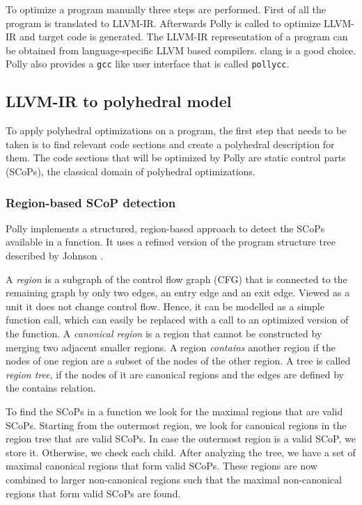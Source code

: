 To optimize a program manually three steps are performed. First of all the
program is translated to LLVM-IR. Afterwards Polly is called to optimize LLVM-IR and
target code is generated. The LLVM-IR representation of a program can
be obtained from language-specific LLVM based compilers. clang is a
good choice. Polly also provides a \texttt{gcc} like user interface that is
called \texttt{pollycc}.

\subsection{LLVM-IR to polyhedral model}

To apply polyhedral optimizations on a program, the first step that needs to be
taken is to find relevant code sections and create a polyhedral description for
them. The code sections that will be optimized by Polly are static
control parts (SCoPs), the classical domain of polyhedral optimizations.

\subsubsection{Region-based SCoP detection}
Polly implements a structured, region-based approach to detect
the SCoPs available in a function. It uses a refined version of the program
structure tree described by Johnson \cite{Johnson}.

A \emph{region} is a subgraph of the control flow graph (CFG) that is connected to the
remaining graph by only two edges, an entry edge and an exit edge.  Viewed as a
unit it does not change control flow. Hence, it can be modelled as a
simple function call, which can easily be replaced with a call to an optimized
version of the function.  A \emph{canonical region} is a region that cannot be
constructed by merging two adjacent smaller regions. A region \emph{contains}
another region if the nodes of one region are a subset of the nodes of the other
region. A tree is called \emph{region tree}, if the nodes of it are canonical regions
and the edges are defined by the contains relation.

To find the SCoPs in a function we look for the maximal regions that are valid
SCoPs. Starting from the outermost region, we look for canonical regions in the
region tree that are valid SCoPs. In case the outermost region is a valid SCoP,
we store it. Otherwise, we check each child. After analyzing the tree, we have a
set of maximal canonical regions that form valid SCoPs. These regions are now
combined to larger non-canonical regions such that the maximal 
non-canonical regions that form valid SCoPs are found.


